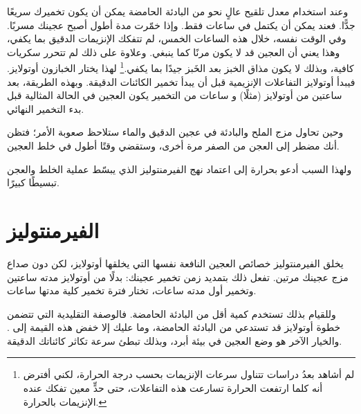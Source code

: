 وعند استخدام معدل تلقيح عالٍ نحو  من البادئة الحامضة يمكن أن يكون تخميرك سريعًا جدًّا. فعند  يمكن أن يكتمل في  ساعات فقط. وإذا خمّرت مدة أطول أصبح عجينك مسربًا. وفي الوقت نفسه، خلال هذه الساعات الخمس، لم تتفكك الإنزيمات الدقيق بما يكفي، وهذا يعني أن العجين قد لا يكون مرنًا كما ينبغي. وعلاوة على ذلك لم تتحرر سكريات كافية، وبذلك لا يكون مذاق الخبز بعد الخَبز جيدًا بما يكفي.\footnote{لم أشاهد بعدُ دراسات تتناول سرعات الإنزيمات بحسب درجة الحرارة، لكني أفترض أنه كلما ارتفعت الحرارة تسارعت هذه التفاعلات، حتى حدٍّ معين تفكك عنده الإنزيمات بالحرارة.} لهذا يختار الخبازون أوتولايز. فيبدأ أوتولايز التفاعلات الإنزيمية قبل أن يبدأ تخمير الكائنات الدقيقة. وبهذه الطريقة، بعد ساعتين من أوتولايز (مثلًا) و ساعات من التخمير يكون العجين في الحالة المثالية قبل بدء التخمير النهائي.

وحين تحاول مزج الملح والبادئة في عجين الدقيق والماء ستلاحظ صعوبة الأمر؛ فتظن أنك مضطر إلى العجن من الصفر مرة أخرى، وستقضي وقتًا أطول في خلط العجين.

ولهذا السبب أدعو بحرارة إلى اعتماد نهج الفيرمنتوليز الذي يبسّط عملية الخلط والعجن تبسيطًا كبيرًا.

\section{الفيرمنتوليز}%
\label{sec:fermentolysis}

يخلق الفيرمنتوليز خصائص العجين النافعة نفسها التي يخلقها أوتولايز، لكن دون صداع مزج عجينك مرتين. تفعل ذلك بتمديد زمن تخمير عجينك: بدلًا من أوتولايز مدته ساعتين وتخمير أول مدته  ساعات، تختار فترة تخمير كلية مدتها  ساعات.

وللقيام بذلك تستخدم كمية أقل من البادئة الحامضة. فالوصفة التقليدية التي تتضمن خطوة أوتولايز قد تستدعي  من البادئة الحامضة، وما عليك إلا خفض هذه القيمة إلى . والخيار الآخر هو وضع العجين في بيئة أبرد، وبذلك تبطئ سرعة تكاثر كائناتك الدقيقة.

\begin{table}[htb]
    \centering
        
        \caption[كمية البادئة]{جدول يوضح كمية البادئة الحامضة التي ينبغي استخدامها بحسب درجة الحرارة ومستوى نشاط البادئة.}
\end{table}

